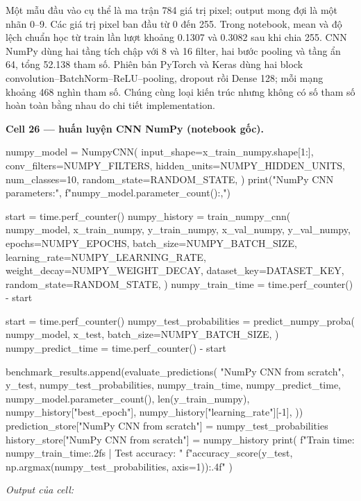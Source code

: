 \documentclass[12pt,a4paper]{report}
\begin{document}
Một mẫu đầu vào cụ thể là ma trận 784 giá trị pixel; output mong đợi là một nhãn 0--9. Các giá trị pixel ban đầu từ 0 đến 255. Trong notebook, mean và độ lệch chuẩn học từ train lần lượt khoảng 0.1307 và 0.3082 sau khi chia 255. CNN NumPy dùng hai tầng tích chập với 8 và 16 filter, hai bước pooling và tầng ẩn 64, tổng 52.138 tham số. Phiên bản PyTorch và Keras dùng hai block convolution--BatchNorm--ReLU--pooling, dropout rồi Dense 128; mỗi mạng khoảng 468 nghìn tham số. Chúng cùng loại kiến trúc nhưng không có số tham số hoàn toàn bằng nhau do chi tiết implementation.

\par\medskip\noindent\textbf{Cell 26 --- huấn luyện CNN NumPy (notebook gốc).}
\begin{NotebookCode}
numpy_model = NumpyCNN(
    input_shape=x_train_numpy.shape[1:],
    conv_filters=NUMPY_FILTERS,
    hidden_units=NUMPY_HIDDEN_UNITS,
    num_classes=10,
    random_state=RANDOM_STATE,
)
print("NumPy CNN parameters:", f"{numpy_model.parameter_count():,}")

start = time.perf_counter()
numpy_history = train_numpy_cnn(
    numpy_model,
    x_train_numpy,
    y_train_numpy,
    x_val_numpy,
    y_val_numpy,
    epochs=NUMPY_EPOCHS,
    batch_size=NUMPY_BATCH_SIZE,
    learning_rate=NUMPY_LEARNING_RATE,
    weight_decay=NUMPY_WEIGHT_DECAY,
    dataset_key=DATASET_KEY,
    random_state=RANDOM_STATE,
)
numpy_train_time = time.perf_counter() - start

start = time.perf_counter()
numpy_test_probabilities = predict_numpy_proba(
    numpy_model,
    x_test,
    batch_size=NUMPY_BATCH_SIZE,
)
numpy_predict_time = time.perf_counter() - start

benchmark_results.append(evaluate_predictions(
    "NumPy CNN from scratch",
    y_test,
    numpy_test_probabilities,
    numpy_train_time,
    numpy_predict_time,
    numpy_model.parameter_count(),
    len(y_train_numpy),
    numpy_history["best_epoch"],
    numpy_history["learning_rate"][-1],
))
prediction_store["NumPy CNN from scratch"] = numpy_test_probabilities
history_store["NumPy CNN from scratch"] = numpy_history
print(
    f"Train time: {numpy_train_time:.2f}s | Test accuracy: "
    f"{accuracy_score(y_test, np.argmax(numpy_test_probabilities, axis=1)):.4f}"
)
\end{NotebookCode}
\noindent\textit{Output của cell:}
\end{document}
